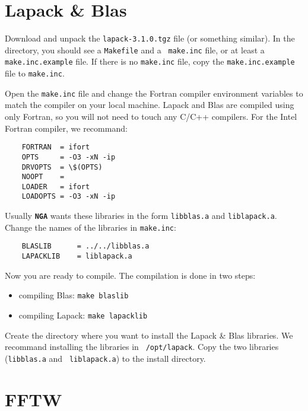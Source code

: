 \documentclass[10pt, oneside, onecolumn]{article}
\begin{document}
  \section{Lapack \& Blas}

  Download and unpack the {\tt lapack-3.1.0.tgz} file (or something similar).
  In the directory, you should see a {\tt Makefile} and a {\tt
  make.inc} file, or at least a {\tt make.inc.example} file. If there
  is no {\tt make.inc} file, copy the {\tt make.inc.example} file to
  {\tt make.inc}. 
  
  Open the {\tt make.inc} file and change the Fortran compiler environment 
  variables to match the compiler on your local machine.  Lapack and 
  Blas are compiled using only Fortran, so you will not need to touch 
  any C/C++ compilers. For the Intel Fortran compiler, we recommand:
  \begin{verbatim}
    FORTRAN  = ifort
    OPTS     = -O3 -xN -ip
    DRVOPTS  = \$(OPTS)
    NOOPT    =
    LOADER   = ifort
    LOADOPTS = -O3 -xN -ip
  \end{verbatim}
  
  Usually {\tt\bf NGA} wants these libraries in the form {\tt libblas.a}
  and {\tt liblapack.a}. Change the names of the libraries in {\tt make.inc}:
  \begin{verbatim}
    BLASLIB      = ../../libblas.a
    LAPACKLIB    = liblapack.a
  \end{verbatim}

  Now you are ready to compile. The compilation is done in two steps:
  \begin{itemize}
    \item compiling Blas: {\tt make blaslib}
    \item compiling Lapack: {\tt make lapacklib}
  \end{itemize}
  
  Create the directory where you want to install the Lapack \& Blas
  libraries. We recommand installing the libraries in {\tt
  /opt/lapack}. Copy the two libraries ({\tt libblas.a} and {\tt
  liblapack.a}) to the install directory.

  \section{FFTW}
\end{document}
